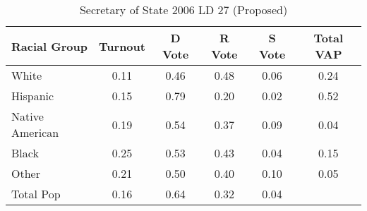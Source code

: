 \begin{table}[htb]
\begin{center}
\caption{Secretary of State 2006 LD 27 (Proposed)}
\label{sos06_vap_ld_27}
\begin{tabular}{lccccc}
  \hline
Racial Group & Turnout & D Vote & R Vote & S Vote & Total VAP \\ 
  \hline
White & 0.11 & 0.46 & 0.48 & 0.06 & 0.24 \\ 
  Hispanic & 0.15 & 0.79 & 0.20 & 0.02 & 0.52 \\ 
  Native American & 0.19 & 0.54 & 0.37 & 0.09 & 0.04 \\ 
  Black & 0.25 & 0.53 & 0.43 & 0.04 & 0.15 \\ 
  Other & 0.21 & 0.50 & 0.40 & 0.10 & 0.05 \\ 
  Total Pop & 0.16 & 0.64 & 0.32 & 0.04 &  \\ 
   \hline
\end{tabular}
\end{center}
\end{table}
